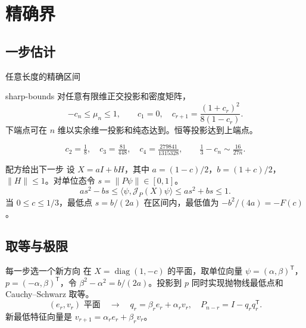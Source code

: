\documentclass{beamer}
\begin{document}
\section{精确界}
\subsection{一步估计}
\begin{frame}{任意长度的精确区间}
\begin{bookresult}{sharp-bounds}
对任意有限维正交投影和密度矩阵，
\[
 -c_n\le\mu_n\le1,\qquad c_1=0,\quad c_{r+1}=\frac{(1+c_r)^2}{8(1-c_r)}.
\]
下端点可在 $n$ 维以实余维一投影和纯态达到。恒等投影达到上端点。
\end{bookresult}
\[
 c_2=\tfrac18,\quad c_3=\tfrac{81}{448},\quad c_4=\tfrac{279841}{1315328},
 \qquad \tfrac13-c_n\sim\tfrac{16}{27n}.
\]
\end{frame}

\begin{frame}{配方给出下一步}
设 $X=aI+bH$，其中 $a=(1-c)/2$，$b=(1+c)/2$，$\|H\|\le1$。对单位态令 $s=\|P\psi\|\in[0,1]$。
\[
 as^2-bs\le\langle\psi,\mathcal J_P(X)\psi\rangle\le as^2+bs\le1.
\]
当 $0\le c\le1/3$，最低点 $s=b/(2a)$ 在区间内，最低值为 $-b^2/(4a)=-F(c)$。
\end{frame}

\subsection{取等与极限}
\begin{frame}{每一步选一个新方向}
在 $X=\operatorname{diag}(1,-c)$ 的平面，取单位向量 $\psi=(\alpha,\beta)^{\mathsf T}$，$p=(-\alpha,\beta)^{\mathsf T}$，令 $\beta^2-\alpha^2=b/(2a)$。投影到 $p$ 同时实现抛物线最低点和 Cauchy--Schwarz 取等。
\[
 (e_r,v_r)\text{ 平面}\quad\longrightarrow\quad
 q_r=\beta_r e_r+\alpha_r v_r,\quad P_{n-r}=I-q_rq_r^{\mathsf T}.
\]
新最低特征向量是 $v_{r+1}=\alpha_r e_r+\beta_r v_r$。
\end{frame}
\end{document}
